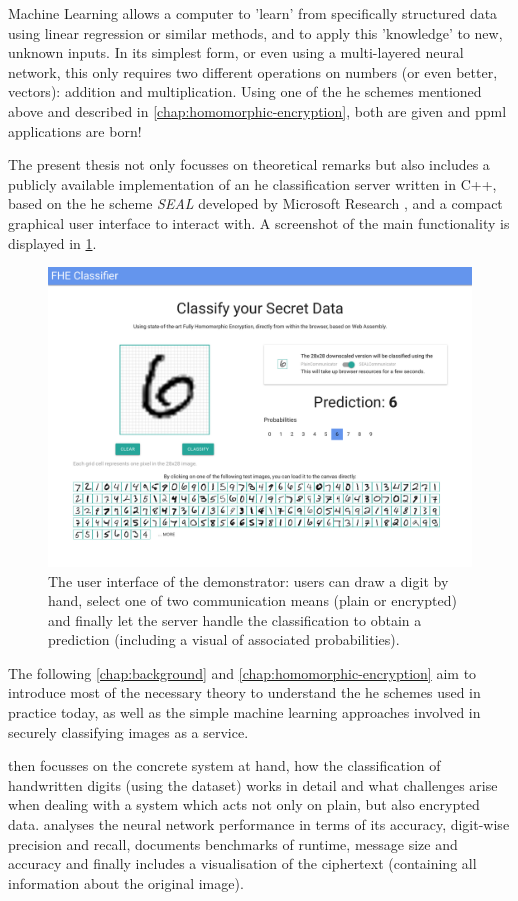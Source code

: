 Machine Learning allows a computer to 'learn' from specifically structured data using linear regression or similar methods, and to apply this 'knowledge' to new, unknown inputs.
In its simplest form, or even using a multi-layered neural network, this only requires two different operations on numbers (or even better, vectors): addition and multiplication.
Using one of the \gls{he} schemes mentioned above and described in \cref{chap:homomorphic-encryption}, both are given and \gls{ppml} applications are born!

The present thesis not only focusses on theoretical remarks but also includes a publicly available implementation of an \gls{he} classification server written in C++, based on the \glsdesc{he} scheme \textit{SEAL} developed by Microsoft Research \parencite{seal-4.0}, and a compact graphical user interface to interact with.
A screenshot of the main functionality is displayed in \cref{fig:frontend}.

\begin{figure}[H]
  \centering
  \includegraphics[width=\linewidth]{figures/frontend.pdf}
  \vspace{-1.2cm}
  \caption[User interface of the demonstrator]{The user interface of the demonstrator: users can draw a digit by hand, select one of two communication means (plain or encrypted) and finally let the server handle the classification to obtain a prediction (including a visual of associated probabilities).}
  \label{fig:frontend}
\end{figure}

The following \cref{chap:background} and \cref{chap:homomorphic-encryption} aim to introduce most of the necessary theory to understand the \gls{he} schemes used in practice today, as well as the simple machine learning approaches involved in securely classifying images as a service.

 then focusses on the concrete system at hand, how the classification of handwritten digits (using the  dataset) works in detail and what challenges arise when dealing with a system which acts not only on plain, but also encrypted data.
 analyses the neural network performance in terms of its accuracy, digit-wise precision and recall, documents benchmarks of runtime, message size and accuracy and finally includes a visualisation of the ciphertext (containing all information about the original image).
